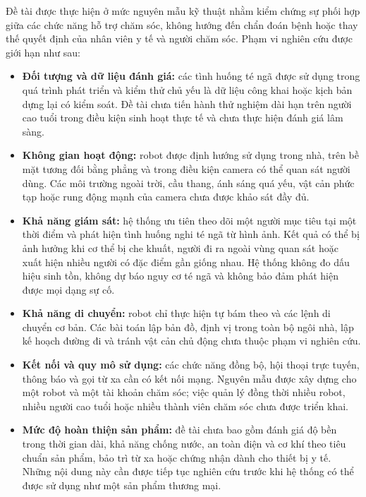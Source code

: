 Đề tài được thực hiện ở mức nguyên mẫu kỹ thuật nhằm kiểm chứng sự phối hợp giữa các chức năng hỗ trợ chăm sóc, không hướng đến chẩn đoán bệnh hoặc thay thế quyết định của nhân viên y tế và người chăm sóc. Phạm vi nghiên cứu được giới hạn như sau:

\begin{itemize}
    \item \textbf{Đối tượng và dữ liệu đánh giá:} các tình huống té ngã được sử dụng trong quá trình phát triển và kiểm thử chủ yếu là dữ liệu công khai hoặc kịch bản dựng lại có kiểm soát. Đề tài chưa tiến hành thử nghiệm dài hạn trên người cao tuổi trong điều kiện sinh hoạt thực tế và chưa thực hiện đánh giá lâm sàng.

    \item \textbf{Không gian hoạt động:} robot được định hướng sử dụng trong nhà, trên bề mặt tương đối bằng phẳng và trong điều kiện camera có thể quan sát người dùng. Các môi trường ngoài trời, cầu thang, ánh sáng quá yếu, vật cản phức tạp hoặc rung động mạnh của camera chưa được khảo sát đầy đủ.

    \item \textbf{Khả năng giám sát:} hệ thống ưu tiên theo dõi một người mục tiêu tại một thời điểm và phát hiện tình huống nghi té ngã từ hình ảnh. Kết quả có thể bị ảnh hưởng khi cơ thể bị che khuất, người đi ra ngoài vùng quan sát hoặc xuất hiện nhiều người có đặc điểm gần giống nhau. Hệ thống không đo dấu hiệu sinh tồn, không dự báo nguy cơ té ngã và không bảo đảm phát hiện được mọi dạng sự cố.

    \item \textbf{Khả năng di chuyển:} robot chỉ thực hiện tự bám theo và các lệnh di chuyển cơ bản. Các bài toán lập bản đồ, định vị trong toàn bộ ngôi nhà, lập kế hoạch đường đi và tránh vật cản chủ động chưa thuộc phạm vi nghiên cứu.

    \item \textbf{Kết nối và quy mô sử dụng:} các chức năng đồng bộ, hội thoại trực tuyến, thông báo và gọi từ xa cần có kết nối mạng. Nguyên mẫu được xây dựng cho một robot và một tài khoản chăm sóc; việc quản lý đồng thời nhiều robot, nhiều người cao tuổi hoặc nhiều thành viên chăm sóc chưa được triển khai.

    \item \textbf{Mức độ hoàn thiện sản phẩm:} đề tài chưa bao gồm đánh giá độ bền trong thời gian dài, khả năng chống nước, an toàn điện và cơ khí theo tiêu chuẩn sản phẩm, bảo trì từ xa hoặc chứng nhận dành cho thiết bị y tế. Những nội dung này cần được tiếp tục nghiên cứu trước khi hệ thống có thể được sử dụng như một sản phẩm thương mại.
\end{itemize}

